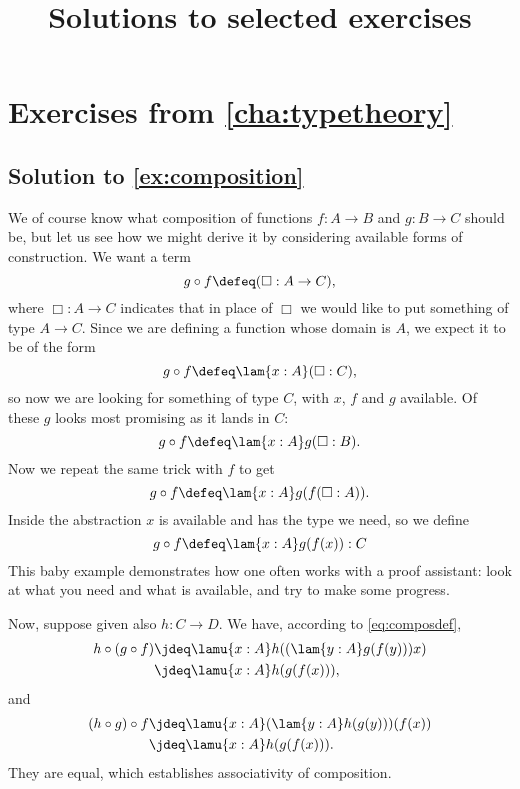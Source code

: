 \documentclass[
%
%
11pt %
]{article}
\title{Solutions to selected exercises}
\begin{document}
\maketitle

\section*{Exercises from \cref{cha:typetheory}}

\subsection*{Solution to \cref{ex:composition}}

We of course know what composition of functions $f : A \to B$ and $g : B \to C$ should be, but let us see how we might derive it by considering available forms of construction. We want a term
\[ g \circ f \defeq (\Box : A \to C), \]
where $\Box : A \to C$ indicates that in place of $\Box$ we would like to put something of type $A \to C$.
Since we are defining a function whose domain is $A$, we expect it to be of the form
\[ g \circ f \defeq \lam{x:A} (\Box : C), \]
so now we are looking for something of type $C$, with $x$, $f$ and $g$ available. Of these $g$ looks most promising as it lands in $C$:
\[ g \circ f \defeq \lam{x:A} g (\Box : B). \]
Now we repeat the same trick with $f$ to get
\[ g \circ f \defeq \lam{x:A} g(f(\Box : A)). \]
Inside the abstraction $x$ is available and has the type we need, so we define
\begin{equation}
  \label{eq:composdef}
   g \circ f \defeq \lam{x:A} g(f(x)) : C
\end{equation}
%
This baby example demonstrates how one often works with a proof assistant: look at what
you need and what is available, and try to make some progress.

Now, suppose given also $h : C \to D$. We have, according to \cref{eq:composdef},
%
\begin{align*}
  h \circ (g \circ f) &\jdeq \lamu{x:A} h ((\lam{y:A} g(f(y))) x)\\
                      &\jdeq \lamu{x:A} h(g(f(x))),
\end{align*}
%
and
%
\begin{align*}
  (h \circ  g) \circ f & \jdeq \lamu{x:A} (\lam{y:A} h(g(y))) (f(x))\\
                       & \jdeq \lamu{x:A} h(g(f(x))).
\end{align*}
%
They are equal, which establishes associativity of composition.
\end{document}
